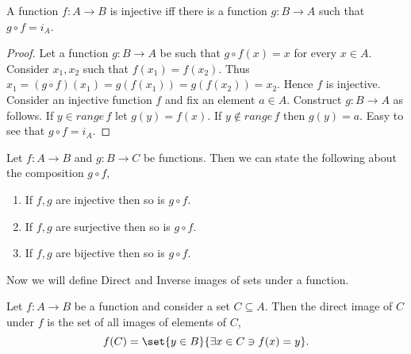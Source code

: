 \begin{Theorem}
    A function $f : A \to B$ is injective iff there is a function $g : B \to A$ such that $g \circ
    f = i_A$.
\end{Theorem}
\begin{proof}
    Let a function $g : B \to A$ be such that $g\circ f (x) = x $ for every $x \in A$. Consider
    $x_1,x_2$ such that $f(x_1) = f(x_2)$. Thus $x_1 = (g \circ f)(x_1) = g(f(x_1)) = g(f(x_2)) = 
    x_2$. Hence $f$ is injective. Consider an injective function $f$ and fix an element $a \in A$.
    Construct $g : B \to A$ as follows. If $y \in range\,f$ let $g(y) = f(x)$. If $y \not \in
    range\,f$ then $g(y) = a$. Easy to see that $g\circ f = i_A$. 
\end{proof}

\begin{Theorem}
    Let $f : A \to B$ and $g : B \to C$ be functions. Then we can state the following about the
    composition $g \circ f$,
    \begin{enumerate}
	\item If $f,g$ are injective then so is $g \circ f$.
	\item If $f,g$ are surjective then so is $g \circ f$.
	\item If $f,g$ are bijective then so is $g \circ f$.
    \end{enumerate}
\end{Theorem}

Now we will define Direct and Inverse images of sets under a function.
\begin{Definition}
    Let $f : A \to B$ be a function and consider a set $C \subseteq A$. Then the direct image of $C$
    under $f$ is the set of all images of elements of $C$,
    \begin{equation*}
	f(C) = \set{y \in B}{\exists x \in C \ni f(x) = y}.
    \end{equation*}
\end{Definition}

